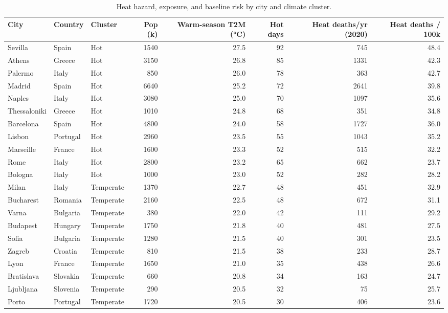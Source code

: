 \begin{table}[ht]
\centering
\caption{Heat hazard, exposure, and baseline risk by city and climate cluster.} 
\label{tab:risk_by_city}
\begin{tabular}{lllrrrrr}
  \toprule
City & Country & Cluster & Pop (k) & Warm-season T2M (°C) & Hot days & Heat deaths/yr (2020) & Heat deaths / 100k \\ 
  \midrule
Sevilla & Spain & Hot & 1540 & 27.5 & 92 & 745 & 48.4 \\ 
  Athens & Greece & Hot & 3150 & 26.8 & 85 & 1331 & 42.3 \\ 
  Palermo & Italy & Hot & 850 & 26.0 & 78 & 363 & 42.7 \\ 
  Madrid & Spain & Hot & 6640 & 25.2 & 72 & 2641 & 39.8 \\ 
  Naples & Italy & Hot & 3080 & 25.0 & 70 & 1097 & 35.6 \\ 
  Thessaloniki & Greece & Hot & 1010 & 24.8 & 68 & 351 & 34.8 \\ 
  Barcelona & Spain & Hot & 4800 & 24.0 & 58 & 1727 & 36.0 \\ 
  Lisbon & Portugal & Hot & 2960 & 23.5 & 55 & 1043 & 35.2 \\ 
  Marseille & France & Hot & 1600 & 23.3 & 52 & 515 & 32.2 \\ 
  Rome & Italy & Hot & 2800 & 23.2 & 65 & 662 & 23.7 \\ 
  Bologna & Italy & Hot & 1000 & 23.0 & 52 & 282 & 28.2 \\ 
  Milan & Italy & Temperate & 1370 & 22.7 & 48 & 451 & 32.9 \\ 
  Bucharest & Romania & Temperate & 2160 & 22.5 & 48 & 672 & 31.1 \\ 
  Varna & Bulgaria & Temperate & 380 & 22.0 & 42 & 111 & 29.2 \\ 
  Budapest & Hungary & Temperate & 1750 & 21.8 & 40 & 481 & 27.5 \\ 
  Sofia & Bulgaria & Temperate & 1280 & 21.5 & 40 & 301 & 23.5 \\ 
  Zagreb & Croatia & Temperate & 810 & 21.5 & 38 & 233 & 28.7 \\ 
  Lyon & France & Temperate & 1650 & 21.0 & 35 & 438 & 26.6 \\ 
  Bratislava & Slovakia & Temperate & 660 & 20.8 & 34 & 163 & 24.7 \\ 
  Ljubljana & Slovenia & Temperate & 290 & 20.5 & 32 & 75 & 25.7 \\ 
  Porto & Portugal & Temperate & 1720 & 20.5 & 30 & 406 & 23.6 \\ 

\end{tabular}
\end{table}
